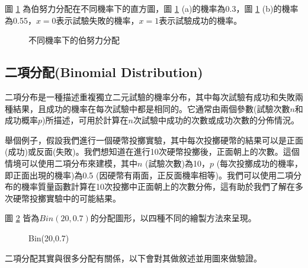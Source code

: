 \documentclass[12pt, a4paper]{article}
\begin{document}
圖 \ref{fig:bernoulli(p)} 為伯努力分配在不同機率下的直方圖，圖 \ref{fig:bernoulli(p)} (a)的機率為0.3，圖 \ref{fig:bernoulli(p)} (b)的機率為0.55，$x=0$表示試驗失敗的機率，$x=1$表示試驗成功的機率。
\begin{figure}[h]
    \centering
    \caption{不同機率下的伯努力分配}
    \label{fig:bernoulli(p)}
\end{figure}
\subsection{二項分配(Binomial Distribution)}
二項分布是一種描述重複獨立二元試驗的機率分布，其中每次試驗有成功和失敗兩種結果，且成功的機率在每次試驗中都是相同的。它通常由兩個參數(試驗次數$n$和成功概率$p$)所描述，可用於計算在$n$次試驗中成功的次數或成功次數的分佈情況。

舉個例子，假設我們進行一個硬幣投擲實驗，其中每次投擲硬幣的結果可以是正面(成功)或反面(失敗)。我們想知道在進行10次硬幣投擲後，正面朝上的次數。這個情境可以使用二項分布來建模，其中$n$ (試驗次數)為10，$p$ (每次投擲成功的機率，即正面出現的機率)為0.5 (因硬幣有兩面，正反面機率相等)。我們可以使用二項分布的機率質量函數計算在10次投擲中正面朝上的次數分佈，這有助於我們了解在多次硬幣投擲實驗中的可能結果。

圖 \ref{fig:binomial(20,0.7)} 皆為$Bin(20,0.7)$的分配圖形，以四種不同的繪製方法來呈現。
\begin{figure}[h]
    \caption{Bin(20,0.7)}
    \label{fig:binomial(20,0.7)}
\end{figure}

二項分配其實與很多分配有關係，以下會對其做敘述並用圖來做驗證。
\end{document}
